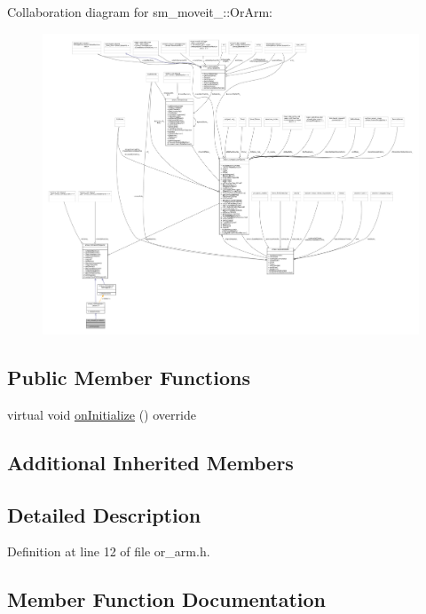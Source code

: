 Collaboration diagram for sm\+\_\+moveit\+\_\+:\+:Or\+Arm\+:
\nopagebreak
\begin{figure}[H]
\begin{center}
\leavevmode
\includegraphics[width=350pt]{classsm__moveit__4_1_1OrArm__coll__graph}
\end{center}
\end{figure}
\subsection*{Public Member Functions}
\begin{DoxyCompactItemize}
\item 
virtual void \hyperlink{classsm__moveit__4_1_1OrArm_a9269c0a4712d81a1ee18640c66fef0ff}{on\+Initialize} () override
\end{DoxyCompactItemize}
\subsection*{Additional Inherited Members}


\subsection{Detailed Description}


Definition at line 12 of file or\+\_\+arm.\+h.



\subsection{Member Function Documentation}
\mbox{\label{classsm__moveit__4_1_1OrArm_a9269c0a4712d81a1ee18640c66fef0ff}} 
